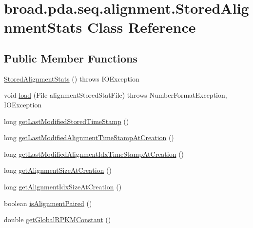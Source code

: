 \hypertarget{classbroad_1_1pda_1_1seq_1_1alignment_1_1_stored_alignment_stats}{\section{broad.\+pda.\+seq.\+alignment.\+Stored\+Alignment\+Stats Class Reference}
\label{classbroad_1_1pda_1_1seq_1_1alignment_1_1_stored_alignment_stats}
}
\subsection*{Public Member Functions}
\begin{DoxyCompactItemize}
\item 
\hyperlink{classbroad_1_1pda_1_1seq_1_1alignment_1_1_stored_alignment_stats_a515c4d71671662820e8cc8a9d249817e}{Stored\+Alignment\+Stats} ()  throws I\+O\+Exception 
\item 
void \hyperlink{classbroad_1_1pda_1_1seq_1_1alignment_1_1_stored_alignment_stats_a3b8e9f6f5482afd64a840d2ff7d09ba9}{load} (File alignment\+Stored\+Stat\+File)  throws Number\+Format\+Exception, I\+O\+Exception 
\item 
long \hyperlink{classbroad_1_1pda_1_1seq_1_1alignment_1_1_stored_alignment_stats_ae4869d1416affe87711445a7d58286b0}{get\+Last\+Modified\+Stored\+Time\+Stamp} ()
\item 
long \hyperlink{classbroad_1_1pda_1_1seq_1_1alignment_1_1_stored_alignment_stats_a1628a35b4c1ea864b79d03d850f09c6a}{get\+Last\+Modified\+Alignment\+Time\+Stamp\+At\+Creation} ()
\item 
long \hyperlink{classbroad_1_1pda_1_1seq_1_1alignment_1_1_stored_alignment_stats_aca6ad81073610ff4847eac7720cc1f4d}{get\+Last\+Modified\+Alignment\+Idx\+Time\+Stamp\+At\+Creation} ()
\item 
long \hyperlink{classbroad_1_1pda_1_1seq_1_1alignment_1_1_stored_alignment_stats_ac38a0828bb7815a9cad14128db297e55}{get\+Alignment\+Size\+At\+Creation} ()
\item 
long \hyperlink{classbroad_1_1pda_1_1seq_1_1alignment_1_1_stored_alignment_stats_a763365a8a09b955eb2143410c6749620}{get\+Alignment\+Idx\+Size\+At\+Creation} ()
\item 
boolean \hyperlink{classbroad_1_1pda_1_1seq_1_1alignment_1_1_stored_alignment_stats_a2a8f34c6e7225509065bc31f113d28f8}{is\+Alignment\+Paired} ()
\item 
double \hyperlink{classbroad_1_1pda_1_1seq_1_1alignment_1_1_stored_alignment_stats_abb5ea3c63cf501daffe23ab9081003ad}{get\+Global\+R\+P\+K\+M\+Constant} ()

\end{DoxyCompactItemize}
